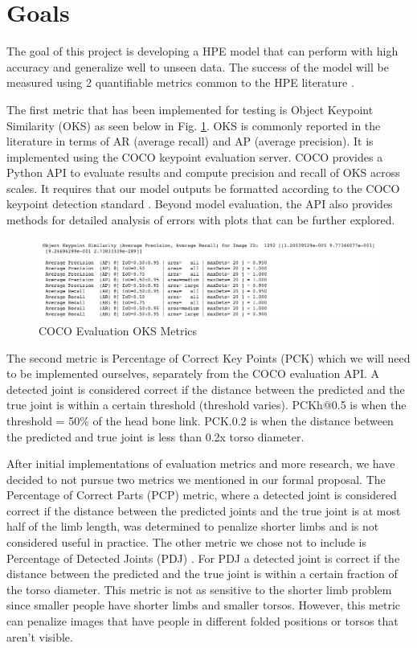 \documentclass[11pt, letterpaper]{article}
\begin{document}
\section{Goals}

The goal of this project is developing a HPE model that can perform with high accuracy and generalize well to unseen data. The success of the model will be measured using 2 quantifiable metrics common to the HPE literature \cite{Babu_2019}. 

The first metric that has been implemented for testing is Object Keypoint Similarity (OKS) as seen below in Fig. \ref{fig:oks_evaluation_metrics}. OKS is commonly reported in the literature in terms of AR (average recall) and AP (average precision). It is implemented using the COCO keypoint evaluation server. COCO provides a Python API \cite{coco_keypoints} to evaluate results and compute precision and recall of OKS across scales. It requires that our model outputs be formatted according to the COCO keypoint detection standard \cite{coco_format_results}. Beyond model evaluation, the API also provides methods for detailed analysis of errors with plots that can be further explored.

\begin{figure}
    \centering
    \includegraphics[width=1\textwidth]{oks_evaluation_metrics.png}
    \caption{COCO Evaluation OKS Metrics}
    \label{fig:oks_evaluation_metrics}
\end{figure}

The second metric is Percentage of Correct Key Points (PCK) \cite{Cbsudux_2019} which we will need to be implemented ourselves, separately from the COCO evaluation API. A detected joint is considered correct if the distance between the predicted and the true joint is within a certain threshold (threshold varies). PCKh@0.5 is when the threshold = 50\% of the head bone link. PCK.0.2 is when the distance between the predicted and true joint is less than 0.2x torso diameter.

After initial implementations of evaluation metrics and more research, we have decided to not pursue two metrics we mentioned in our formal proposal. The Percentage of Correct Parts (PCP) \cite{Cbsudux_2019} metric, where a detected joint is considered correct if the distance between the predicted joints and the true joint is at most half of the limb length, was determined to penalize shorter limbs and is not considered useful in practice. The other metric we chose not to include is Percentage of Detected Joints (PDJ) \cite{Cbsudux_2019}. For PDJ a detected joint is correct if the distance between the predicted and the true joint is within a certain fraction of the torso diameter. This metric is not as sensitive to the shorter limb problem since smaller people have shorter limbs and smaller torsos. However, this metric can penalize images that have people in different folded positions or torsos that aren’t visible.
\end{document}
